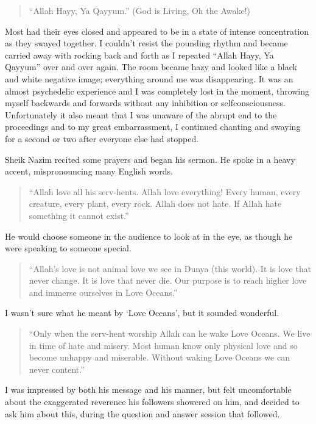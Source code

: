 \documentclass[12pt]{memoir}
\begin{document}
\begin{quote}
“Allah Hayy, Ya Qayyum.” (God is Living, Oh the Awake!)
\end{quote}

Most had their eyes closed and appeared to be
in a state of intense concentration as they swayed together.
I couldn’t resist the pounding rhythm
and became carried away with rocking back
and forth as I repeated “Allah Hayy, Ya Qayyum” over and over again.
The room became hazy and looked like a black and white negative image;
everything around me was disappearing.
It was an almost psychedelic experience
and I was completely lost in the moment,
throwing myself backwards and forwards without any inhibition
or self\cor{ }{\–}consciousness.
Unfortunately it also meant that I was unaware of the abrupt end
to the proceedings and to my great embarrassment,
I continued chanting and swaying for a second or two
after everyone else had stopped.

Sheik Nazim recited some prayers and began his sermon.
He spoke in a heavy accent, mispronouncing many English words.

\begin{quote}
“Allah love all his serv-hents. Allah love everything!
Every human, every creature, every plant, every rock.
Allah does not hate. If Allah hate something it cannot exist.”
\end{quote}

He would choose someone in the audience to look at in the eye,
as though he were speaking to someone special.

\begin{quote}
“Allah’s love is not animal love we see in Dunya (this world).
It is love that never change. It is love that never die.
Our purpose is to reach higher love and immerse ourselves in Love Oceans.”
\end{quote}

I wasn’t sure what he meant by ‘Love Oceans’, but it sounded wonderful.

\begin{quote}
“Only when the serv-hent worship Allah can he wake Love Oceans.
We live in time of hate and misery.
Most human know only physical love and so become unhappy and miserable.
Without waking Love Oceans we can never content.”
\end{quote}

I was impressed by both his message and his manner,
but felt uncomfortable about the exaggerated reverence
his followers showered on him,
and decided to ask him about this,
during the question and answer session that followed.
\end{document}
